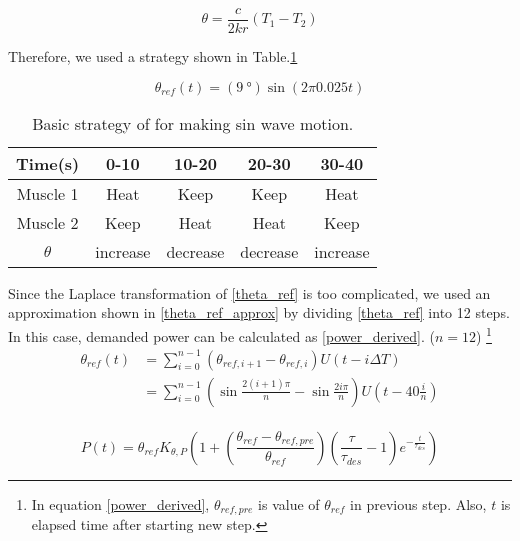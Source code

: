 \begin{equation}\label{EqAngleTempDiff}
\theta=\frac{c}{2kr}(T_1-T_2)
\end{equation}

Therefore, we used a strategy shown in Table.\ref{table_apc_basic}

\begin{equation}\label{theta_ref}
\theta_{ref}(t)=(\SI{9}{\degree})\sin(2\pi 0.025t)
\end{equation}

\begin{table}[h]
	\caption{Basic strategy of \apc for making sin wave motion.}
	\label{table_apc_basic}
	\begin{center}
		\begin{tabular}{c||c|c|c|c}
			\hline
			Time(s) & 0-10 & 10-20 & 20-30 & 30-40 \\
			\hline
			Muscle 1 & Heat & Keep & Keep & Heat \\
			Muscle 2 & Keep & Heat & Heat & Keep \\
			\hline
			$\theta$ & increase & decrease & decrease & increase \\
			\hline
		\end{tabular}
	\end{center}
\end{table}

Since the Laplace transformation of \eqref{theta_ref} is too complicated, we used an approximation shown in \eqref{theta_ref_approx} by dividing \eqref{theta_ref} into 12 steps. In this case, demanded power can be calculated as \eqref{power_derived}. ($n=12$)
\footnote{In equation \eqref{power_derived}, $\theta_{ref,pre}$ is value of $\theta_{ref}$ in previous step. Also, $t$ is elapsed time after starting new step.}
\begin{equation} \label{theta_ref_approx}
\begin{aligned} 
\theta_{ref}(t) & = \sum_{i=0}^{n-1}{(\theta_{ref,i+1}-\theta_{ref,i})U(t-i\Delta T)} \\
& = \sum_{i=0}^{n-1}{(\sin{\frac{2(i+1)\pi}{n}}-\sin{\frac{2i\pi}{n}})U(t-40\frac{i}{n})} \\
\end{aligned}
\end{equation}

\begin{equation} \label{power_derived}
P(t)=\theta_{ref}K_{\theta,P}(1+(\frac{\theta_{ref}-\theta_{ref,pre}}{\theta_{ref}})(\frac{\tau}{\tau_{des}}-1)e^{-\frac{t}{\tau_{des}}})
\end{equation}

